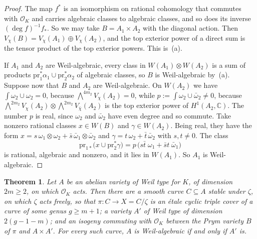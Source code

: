 \documentclass[11pt]{amsart}
\newtheorem{theorem}{Theorem}[section]
\theoremstyle{definition}
\theoremstyle{remark}
\newcommand{\CC}{\mathbb{C}}
\newcommand{\cO}{\mathcal{O}}
\begin{document}
\begin{proof}
The map $f^{*}$ is an isomorphism on rational cohomology that commutes with
$\cO_{K}$ and carries algebraic classes to algebraic classes, and so does its
inverse $(\deg f)^{-1}f_{*}$. So we may take $B=A_{1}\times A_{2}$ with the
diagonal action. Then $V_{\chi}(B)=V_{\chi}(A_{1})\oplus V_{\chi}(A_{2})$, and
the top exterior power of a direct sum is the tensor product of the top
exterior powers. This is~(a).

If $A_{1}$ and $A_{2}$ are Weil-algebraic, every class in
$W(A_{1})\otimes W(A_{2})$ is a sum of products
$\mathrm{pr}_{1}^{*}\alpha_{1}\cup\mathrm{pr}_{2}^{*}\alpha_{2}$ of algebraic
classes, so $B$ is Weil-algebraic by~(a). Suppose now that $B$ and $A_{2}$
are Weil-algebraic. On $W(A_{2})$ we have $\int\omega_{2}\cup\omega_{2}=0$,
because $\bigwedge^{4m_{2}}V_{\chi}(A_{2})=0$, while
$p:=\int\omega_{2}\cup\bar\omega_{2}\ne0$, because
$\bigwedge^{2m_{2}}V_{\chi}(A_{2})\otimes\bigwedge^{2m_{2}}V_{\bar\chi}(A_{2})$
is the top exterior power of $H^{1}(A_{2},\CC)$. The number $p$ is real,
since $\omega_{2}$ and $\bar\omega_{2}$ have even degree and so commute. Take nonzero rational
classes $x\in W(B)$ and $\gamma\in W(A_{2})$. Being real, they have the form
$x=s\,\omega_{1}\otimes\omega_{2}+\bar s\,\bar\omega_{1}\otimes\bar\omega_{2}$
and $\gamma=t\,\omega_{2}+\bar t\,\bar\omega_{2}$ with $s,t\ne0$. The class
\[
  \mathrm{pr}_{1*}\bigl(x\cup\mathrm{pr}_{2}^{*}\gamma\bigr)
  =p\,\bigl(s\bar t\;\omega_{1}+\bar s t\;\bar\omega_{1}\bigr)
\]
is rational, algebraic and nonzero, and it lies in $W(A_{1})$. So $A_{1}$ is
Weil-algebraic.
\end{proof}

\begin{theorem}\label{thm:transfer}
Let $A$ be an abelian variety of Weil type for $K$, of dimension $2m\ge2$,
on which $\cO_{K}$ acts. Then there are a smooth curve $C\subseteq A$ stable
under $\zeta$, on which $\zeta$ acts freely, so that $\pi\colon C\to X=C/\zeta$
is an \'etale cyclic triple cover of a curve of some genus $g\ge m+1$; a
variety $A'$ of Weil type of dimension $2(g-1-m)$; and an isogeny commuting
with $\cO_{K}$ between the Prym variety $B$ of $\pi$ and $A\times A'$. For
every such curve, $A$ is Weil-algebraic if and only if $A'$ is.
\end{theorem}
\end{document}

